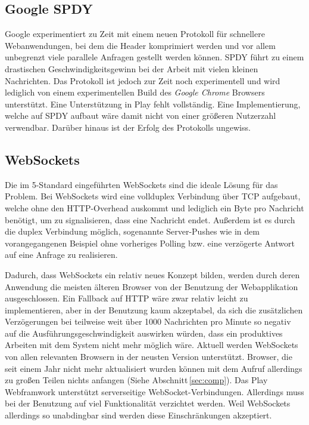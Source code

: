 \subsection{Google SPDY}

Google experimentiert zu Zeit mit einem neuen Protokoll für schnellere Webanwendungen, bei dem die
Header komprimiert werden und vor allem unbegrenzt viele parallele Anfragen gestellt werden können.
SPDY führt zu einem drastischen Geschwindigkeitsgewinn bei der Arbeit mit vielen kleinen
Nachrichten. Das Protokoll ist jedoch zur Zeit noch experimentell und wird lediglich von einem
experimentellen Build des \textit{Google Chrome} Browsers unterstützt. Eine Unterstützung in Play
fehlt vollständig. Eine Implementierung, welche auf SPDY aufbaut wäre damit nicht von einer größeren
Nutzerzahl verwendbar. Darüber hinaus ist der Erfolg des Protokolls ungewiss.

\subsection{WebSockets}
\label{sec:ws}

Die im 5-Standard eingeführten WebSockets sind die ideale Lösung für das Problem. Bei
WebSockets wird eine vollduplex Verbindung über TCP aufgebaut, welche ohne den HTTP-Overhead
auskommt und lediglich ein Byte pro Nachricht benötigt, um zu signalisieren, dass eine Nachricht
endet. Außerdem ist es durch die duplex Verbindung möglich, sogenannte Server-Pushes wie in dem
vorangegangenen Beispiel ohne vorheriges Polling bzw. eine verzögerte Antwort auf eine Anfrage zu
realisieren.

Dadurch, dass WebSockets ein relativ neues Konzept bilden, werden durch deren Anwendung die meisten
älteren Browser von der Benutzung der Webapplikation ausgeschlossen. Ein Fallback auf HTTP wäre zwar
relativ leicht zu implementieren, aber in der Benutzung kaum akzeptabel, da sich die zusätzlichen
Verzögerungen bei teilweise weit über 1000 Nachrichten pro Minute so negativ auf die
Ausführungsgeschwindigkeit auswirken würden, dass ein produktives Arbeiten mit dem System nicht mehr
möglich wäre. Aktuell werden WebSockets von allen relevanten Browsern in der neusten Version
unterstützt. Browser, die seit einem Jahr nicht mehr aktualisiert wurden können mit dem Aufruf
allerdings zu großen Teilen nichts anfangen (Siehe Abschnitt\,\ref{sec:comp}). Das Play Webframwork
unterstützt serverseitige WebSocket-Verbindungen. Allerdings muss bei der Benutzung auf viel
Funktionalität verzichtet werden. Weil WebSockets allerdings so unabdingbar sind werden diese
Einschränkungen akzeptiert.

